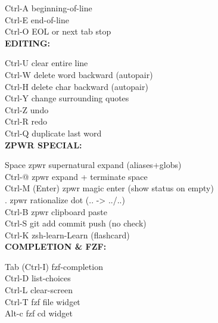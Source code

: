 \documentclass[11pt,a4paper,twoside]{book}
\begin{document}
Ctrl-A                beginning-of-line\\
Ctrl-E                end-of-line\\
Ctrl-O                EOL or next tab stop\\


\vspace{12pt}
{\bfseries\color{neonyellow} EDITING:}\vspace{4pt}

Ctrl-U                clear entire line\\
Ctrl-W                delete word backward (autopair)\\
Ctrl-H                delete char backward (autopair)\\
Ctrl-Y                change surrounding quotes\\
Ctrl-Z                undo\\
Ctrl-R                redo\\
Ctrl-Q                duplicate last word\\


\vspace{12pt}
{\bfseries\color{neonyellow} \textbf{ZPWR} SPECIAL:}\vspace{4pt}

Space                 zpwr supernatural expand (aliases+globs)\\
Ctrl-@                zpwr expand + terminate space\\
Ctrl-M (Enter)        zpwr magic enter (show status on empty)\\
.                     zpwr rationalize dot (.. -> ../..)\\
Ctrl-B                zpwr clipboard paste\\
Ctrl-S                git add commit push (no check)\\
Ctrl-K                zsh-learn-Learn (flashcard)\\


\vspace{12pt}
{\bfseries\color{neonyellow} COMPLETION \& FZF:}\vspace{4pt}

Tab (Ctrl-I)          fzf-completion\\
Ctrl-D                list-choices\\
Ctrl-L                clear-screen\\
Ctrl-T                fzf file widget\\
Alt-c                 fzf cd widget\\
\end{document}
